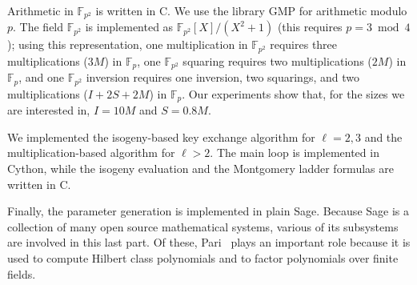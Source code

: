 \documentclass[envcountsect,envcountsame,runningheads]{llncs}   %
\newcommand{\FF}{{\mathbb{F}}}
\begin{document}
Arithmetic in $\FF_{p^2}$ is written in C. We use the library GMP for
arithmetic modulo $p$. The field $\FF_{p^2}$ is implemented as
$\FF_{p^2}[X]/(X^2+1)$ (this requires $p=3\bmod4$); using this
representation, one multiplication in $\FF_{p^2}$ requires three
multiplications ($3M$) in $\FF_p$, one $\FF_{p^2}$ squaring requires
two multiplications ($2M$) in $\FF_p$, and one $\FF_{p^2}$ inversion
requires one inversion, two squarings, and two multiplications
($I+2S+2M$) in $\FF_p$. Our experiments show that, for the sizes we
are interested in, $I=10M$ and $S=0.8M$.

We implemented the isogeny-based key exchange algorithm for $\ell=2,3$
and the multiplication-based algorithm for $\ell>2$.  The main loop is
implemented in Cython, while the isogeny evaluation and the Montgomery
ladder formulas are written in C.

Finally, the parameter generation is implemented in plain
Sage. Because Sage is a collection of many open source mathematical
systems, various of its subsystems are involved in this last part. Of
these, Pari~\cite{Pari} plays an important role because it is used to
compute Hilbert class polynomials and to factor polynomials over
finite fields.
\end{document}
